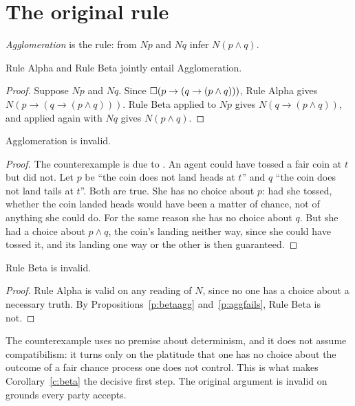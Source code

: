 \documentclass{situationist-preprint}
\begin{document}
\section{The original rule}

\begin{definition}\label{d:agg}
\emph{Agglomeration} is the rule: from $Np$ and $Nq$ infer $N(p \wedge q)$.
\end{definition}

\begin{proposition}\label{p:betaagg}
Rule Alpha and Rule Beta jointly entail Agglomeration.
\end{proposition}

\begin{proof}
Suppose $Np$ and $Nq$. Since $\mathord{\Box}(p \to (q \to (p \wedge q)))$, Rule Alpha gives $N(p \to (q \to (p \wedge q)))$. Rule Beta applied to $Np$ gives $N(q \to (p \wedge q))$, and applied again with $Nq$ gives $N(p \wedge q)$.
\end{proof}

\begin{proposition}\label{p:aggfails}
Agglomeration is invalid.
\end{proposition}

\begin{proof}
The counterexample is due to \citet{McKayJohnson1996}. An agent could have tossed a fair coin at $t$ but did not. Let $p$ be \enquote{the coin does not land heads at $t$} and $q$ \enquote{the coin does not land tails at $t$}. Both are true. She has no choice about $p$: had she tossed, whether the coin landed heads would have been a matter of chance, not of anything she could do. For the same reason she has no choice about $q$. But she had a choice about $p \wedge q$, the coin's landing neither way, since she could have tossed it, and its landing one way or the other is then guaranteed.
\end{proof}

\begin{corollary}\label{c:beta}
Rule Beta is invalid.
\end{corollary}

\begin{proof}
Rule Alpha is valid on any reading of $N$, since no one has a choice about a necessary truth. By Propositions~\ref{p:betaagg} and~\ref{p:aggfails}, Rule Beta is not.
\end{proof}

The counterexample uses no premise about determinism, and it does not assume compatibilism: it turns only on the platitude that one has no choice about the outcome of a fair chance process one does not control. This is what makes Corollary~\ref{c:beta} the decisive first step. The original argument is invalid on grounds every party accepts.
\end{document}
